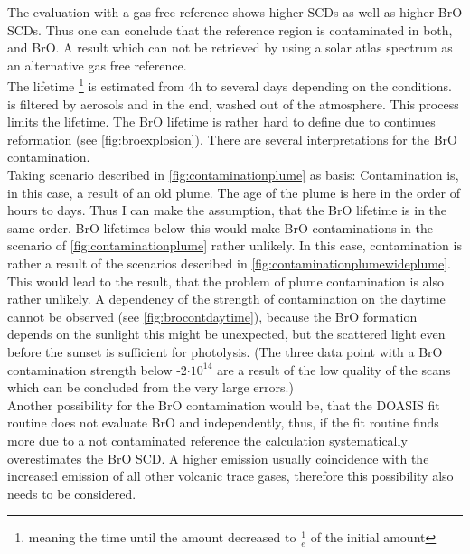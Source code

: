 \documentclass  [
  paper    = a4,
  BCOR     = 10mm,
  twoside,
  fontsize = 12pt,
  fleqn,
  toc      = bibnumbered,
  toc      = listofnumbered,
  numbers  = noendperiod,
  headings = normal,
  listof   = leveldown,
  version  = 3.03
]                                       {scrreprt}
\begin{document}
The evaluation with a gas-free reference shows higher  SCDs as well as higher BrO SCDs. Thus one can conclude that the reference region is contaminated in both,  and BrO. A result which can not be retrieved by using a solar atlas spectrum as an alternative gas free reference.\\
The  lifetime \footnote{meaning the time until the amount decreased to $\frac{1}{e}$ of the initial amount} is estimated from 4h to several days depending on the conditions.  is filtered by aerosols and in the end, washed out of the atmosphere. This process limits the  lifetime.
The BrO lifetime is rather hard to define due to continues reformation (see \cref{fig:broexplosion}).
There are several interpretations for the BrO contamination.\\
Taking scenario described in \cref{fig:contaminationplume} as basis:
Contamination is, in this case, a result of an old plume. The age of the plume is here in the order of hours to days. Thus I can make the assumption, that the BrO lifetime is in the same order.
BrO lifetimes below this would make BrO contaminations in the scenario of \cref{fig:contaminationplume} rather unlikely. In this case, contamination is rather a result of the scenarios described in  \cref{fig:contaminationplumewideplume}. This would lead to the result, that the problem of plume contamination is also rather unlikely.
A dependency of the strength of contamination on the daytime cannot be observed (see \cref{fig:brocontdaytime}), because the BrO formation depends on the sunlight this might be unexpected, but the scattered light even before the sunset is sufficient for  photolysis. (The three data point with a BrO contamination strength below -2$\cdot 10^{14}$ are a result of the low quality of the scans which can be concluded from the very large errors.)\\
Another possibility for the BrO contamination would be, that the DOASIS fit routine does not evaluate BrO and  independently, thus, if the fit routine finds more  due to a not contaminated reference the calculation systematically overestimates the BrO SCD. A higher  emission usually coincidence with the increased emission of all other volcanic trace gases, therefore this possibility also needs to be considered.


%	
\end{document}

